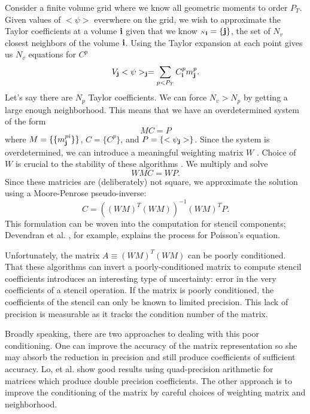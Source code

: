 \documentclass{article}
\newcommand{\ibold}{{\bf i}}
\newcommand{\jbold}{{\bf j}}
\newcommand{\cn}{{\scriptscriptstyle N}}
\begin{document}
Consider a finite volume grid where we know all geometric moments to
order $P_T$.  Given values of $<\psi>$ everwhere on the grid, we wish to
approximate the Taylor coefficients at a volume $\ibold$ given that we
know $\cn_\ibold = \{\jbold\}$, the set of $N_v$ closest neighbors of
the volume $\ibold$.  Using the Taylor expansion at each point gives
us $N_v$ equations for $C^p$
\begin{equation}
  V_\jbold <\psi>_\jbold = \sum\limits_{p < P_T} C^p_\ibold m^p_\jbold.
\end{equation}
Let's say there are $N_p$ Taylor coefficients.  We can force $N_v >
N_p$ by getting a large enough neighborhood.  This means that we have
an overdetermined system of the form
\begin{equation*}
M C = P 
\end{equation*}
where $M = \{\{m^{pi}_\jbold\}\}$, $C=\{C^p\}$,  and $P= \{<\psi_\jbold>\}$.
Since the system is overdetermined, we can introduce a 
meaningful weighting matrix $W$ \footnotemark[3].  Choice of $W$
is crucial to the stability of these algorithms
\footnotemark[4].
We multiply and solve
\begin{equation*}
WMC = WP.
\end{equation*}
Since these matricies are (deliberately) not square, we approximate
the solution using a Moore-Penrose pseudo-inverse:
\begin{equation}
  C = ((WM)^T(WM))^{-1} (WM)^T P.
\label{eqn::getC}  
\end{equation}
This formulation can be woven into the computation for stencil
components;  Devendran et al. \cite{Devendran2017}, for example, explains the
process for Poisson's equation.    

Unfortunately, the matrix $A \equiv (WM)^T(WM)$ can be poorly conditioned.
That these algorithms can invert a poorly-conditioned matrix to compute
stencil coefficients introduces an interesting type of uncertainty: error in
the very coefficients of a stencil operation.   If the matrix is poorly
conditioned, the coefficients of the stencil can only be known to
limited precision.   This lack of precision is measurable as it tracks
the condition number of the matrix.

Broadly speaking, there are two approaches to dealing with this poor
conditioning. One can improve the accuracy of the matrix
representation so she may absorb the reduction in precision and still
produce coefficients of sufficient accuracy.
Lo, et al. \cite{Lo2019} show good results using quad-precision arithmetic
for matrices which produce double precision coefficients.
The other approach is to improve the
conditioning of the matrix by careful choices of weighting matrix and
neighborhood.  
\end{document}
